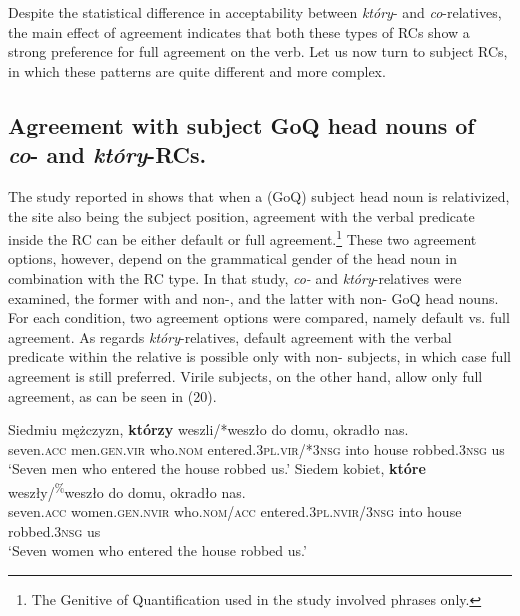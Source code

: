 \documentclass[output=paper]{langsci/langscibook}
\begin{document}
Despite the statistical difference in acceptability between \textit{który}{}- and \textit{co}{}-relatives, the main effect of agreement indicates that both these types of RCs show a strong preference for full agreement on the verb. Let us now turn to subject RCs, in which these patterns are quite different and more complex. 
 
\subsection{Agreement with subject GoQ head nouns of \textit{co}{}- and \textit{który}{}-RCs.}%
The study reported in \citet{Łęska2016} shows that when a  (GoQ) subject head noun is relativized, the  site also being the subject position, agreement with the verbal predicate inside the RC can be either default or full agreement.\footnote{The Genitive of Quantification used in the study involved  phrases only.} These two agreement options, however, depend on the grammatical gender of the head noun in combination with the RC type. In that study, \textit{co-} and \textit{który}{}-relatives were examined, the former with  and non-, and the latter with non- GoQ head nouns. For each condition, two agreement options were compared, namely default vs. full agreement. As regards \textit{który}{}-relatives, default agreement with the verbal predicate within the relative is possible only with non- subjects, in which case full agreement is still preferred. Virile subjects, on the other hand, allow only full agreement, as can be seen in (20).

\ea%
    \label{ex:leska:20}
    \ea
    \gll Siedmiu   mężczyzn,  \textbf{którzy}   weszli/*weszło  do   domu,   okradło     nas.        \\
          seven.\textsc{acc}   men.\textsc{gen.vir}   who.\textsc{nom}  entered.\textsc{3pl.vir/*3nsg}       into  house     robbed.\textsc{3nsg}   us   \\
    \glt ‘Seven men who entered the house robbed us.’
    \ex
    \gll  Siedem   kobiet,     \textbf{które}   weszły/\textsuperscript{\%}weszło       do   domu,   okradło     nas.  \\
           seven.\textsc{acc}   women.\textsc{gen.nvir} who.\textsc{nom/acc}  entered.\textsc{3pl.nvir}/\textsc{3nsg}  into   house     robbed.\textsc{3nsg}   us\\
    \glt  ‘Seven women who entered the house robbed us.’
    \z
\z    
\end{document}
